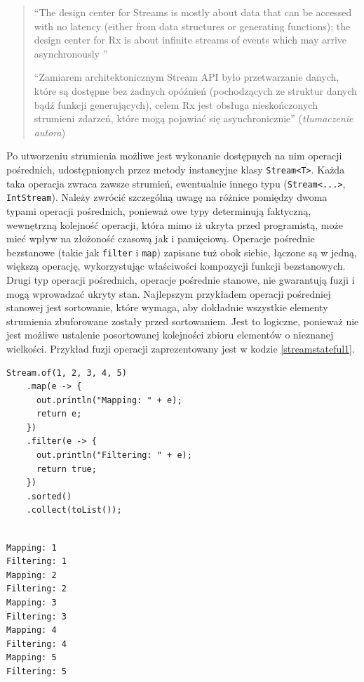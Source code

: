 \documentclass[12pt,twoside,openright]{extarticle}
\begin{document}
\begin{quote}
    ``The design center for Streams is mostly about data that can be accessed with no latency (either from data structures or generating functions); the design center for Rx is about infinite streams of events which may arrive asynchronously \cite{goetz}''

    ``Zamiarem architektonicznym Stream API było przetwarzanie danych, które są dostępne bez żadnych opóźnień (pochodzących ze struktur danych bądź funkcji generujących), celem Rx jest obsługa nieskończonych strumieni zdarzeń, które mogą pojawiać się asynchronicznie''
    (\textit{tłumaczenie autora})

\end{quote}


    Po utworzeniu strumienia możliwe jest wykonanie dostępnych na nim operacji pośrednich, udostępnionych przez metody instancyjne klasy \texttt{Stream<T>}. Każda taka operacja zwraca zawsze strumień, ewentualnie innego typu (\texttt{Stream<...>}, \texttt{IntStream}). Należy zwrócić szczególną uwagę na różnice pomiędzy dwoma typami operacji pośrednich, ponieważ owe typy determinują faktyczną, wewnętrzną kolejność operacji, która mimo iż ukryta przed programistą, może mieć wpływ na złożoność czasową jak i pamięciową. Operacje pośrednie bezstanowe (takie jak \texttt{filter} i \texttt{map}) zapisane tuż obok siebie, łączone są w jedną, większą operację, wykorzystując właściwości kompozycji funkcji bezstanowych. Drugi typ operacji pośrednich, operacje pośrednie stanowe, nie gwarantują fuzji i mogą wprowadzać ukryty stan. Najlepszym przykładem operacji pośredniej stanowej jest sortowanie, które wymaga, aby dokładnie wszystkie elementy strumienia zbuforowane zostały przed sortowaniem. Jest to logiczne, ponieważ nie jest możliwe ustalenie posortowanej kolejności zbioru elementów o nieznanej wielkości. Przykład fuzji operacji zaprezentowany jest w kodzie \ref{streamstateful1}.

\begin{lstlisting}[label=streamstateful1, caption=Fuzja operacji bezstanowych]
Stream.of(1, 2, 3, 4, 5)
    .map(e -> {
      out.println("Mapping: " + e);
      return e;
    })
    .filter(e -> {
      out.println("Filtering: " + e);
      return true;
    })
    .sorted()
    .collect(toList());

\end{lstlisting}


\begin{verbatim}

Mapping: 1
Filtering: 1
Mapping: 2
Filtering: 2
Mapping: 3
Filtering: 3
Mapping: 4
Filtering: 4
Mapping: 5
Filtering: 5

\end{verbatim}
\end{document}
